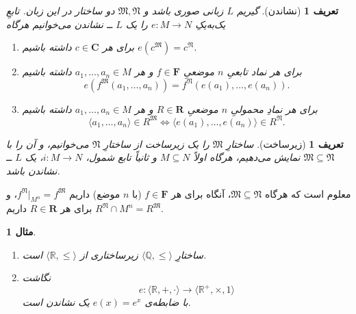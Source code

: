 \documentclass[12pt,a4paper]{article}
\theoremstyle{colorhead}
\newtheorem{mesal}[thm]{مثال}
\newtheorem{defn}[thm]{تعریف}
\begin{document}
\begin{defn}[نشاندن]
\label{neshandan}
گیریم
$L$
زبانی صوری باشد و
$\mathfrak{M},\mathfrak{N}$
دو ساختار در این زبان.  تابعِ یک‌به‌یکِ
$e:M\to N$
را یک
$L$ ــ
\textit{نشاندن}
 می‌خوانیم هرگاه 
\begin{enumerate}
\item 
برای هر
$c\in \mathbf{C}$
داشته باشیم
$e(c^\mathfrak{M})=c^\mathfrak{N}$.
\item 
برای هر نماد تابعیِ
$n$ 
موضعیِ
$f\in \mathbf{F}$
و
هر
$a_1,\ldots, a_n\in M$
داشته باشیم
\[
e(f^\mathfrak{M}(a_1,\ldots, a_n))=f^\mathfrak{N}(e(a_1),\ldots,e(a_n)).
\]
\item 
برای هر نمادِ‌ محمولیِ
$n$
موضعیِ
$R\in \mathbf{R}$
و هر
$a_1,\ldots,a_n\in M$
داشته باشیم
\[
\langle a_1,\ldots,a_n\rangle\in R^\mathfrak{M} \Leftrightarrow 
\langle e(a_1),\ldots,e(a_n)\rangle\in R^\mathfrak{N}.
\]
\end{enumerate}
\end{defn}
\begin{defn}[زیرساخت]
ساختارِ
$\mathfrak{M}$
را یک
 زیرساخت
 از ساختارِ
 $\mathfrak{N}$
 می‌خوانیم، و آن را با
 $\mathfrak{M}\subseteq \mathfrak{N}$
 نمایش می‌دهیم، هرگاه اولاً
 $M\subseteq N$
 و ثانیاً تابع شمول،
 $i:M\to N$،
 یک
 $L$ ــ
 نشاندن باشد. 
\end{defn}
معلوم است که هرگاه
$\mathfrak{M}\subseteq \mathfrak{N}$، 
آنگاه برای هر
$f\in \mathbf{F}$
(با
$n$ موضع)
داریم
$f^\mathfrak{N}|_{M^n}=f^\mathfrak{M}$، 
و برای
هر
$R\in \mathbf{R}$
داریم
$R^\mathfrak{N}\cap M^n=R^\mathfrak{M}$.
\begin{mesal}
\hfill 
\begin{enumerate}
\item 
ساختارِ
$\langle \mathbb{Q},\leq\rangle$
زیرساختاری از
$\langle \mathbb{R},\leq \rangle$
است. 
\item
نگاشت
\[
e:\langle \mathbb{R},+,\cdot\rangle\to \langle \mathbb{R}^+,\times,1\rangle
\]
با ضابطه‌ی
$e(x)=e^x$
یک نشاندن است. 
\end{enumerate}
\end{mesal}
\end{document}
